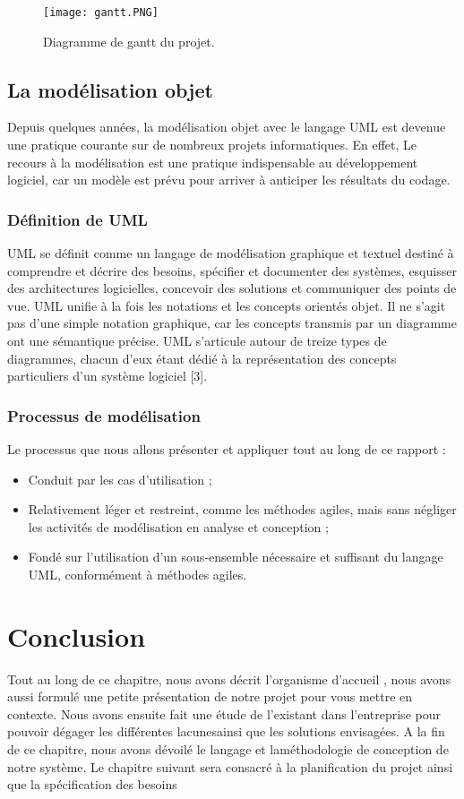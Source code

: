 %
\begin{figure}[ht]
  \centering
  \texttt{[image: gantt.PNG]}
  \caption{Diagramme de gantt du projet.}
  \label{fig:gantt}
\end{figure}
\clearpage
\FloatBarrier
\subsection{La modélisation objet}
Depuis quelques années, la modélisation objet avec le langage UML est devenue une pratique
courante sur de nombreux projets informatiques. En effet, Le recours à la modélisation est
une pratique indispensable au développement logiciel, car un modèle est prévu pour arriver à
anticiper les résultats du codage.
\subsubsection{Définition de UML}
UML se définit comme un langage de modélisation graphique et textuel destiné à comprendre et décrire des besoins, spécifier et documenter des systèmes, esquisser des architectures
logicielles, concevoir des solutions et communiquer des points de vue. UML unifie à la fois les
notations et les concepts orientés objet. Il ne s’agit pas d’une simple notation graphique, car
les concepts transmis par un diagramme ont une sémantique précise.
UML s’articule autour de treize types de diagrammes, chacun d’eux étant dédié à la représentation des concepts particuliers d’un système logiciel [3].


\subsubsection{Processus de modélisation}
Le processus que nous allons présenter et appliquer tout au long de ce rapport :

\begin{itemize}
	\item Conduit par les cas d’utilisation ;
	\item Relativement léger et restreint, comme les méthodes agiles, mais sans négliger les activités
	de modélisation en analyse et conception ;
	\item Fondé sur l’utilisation d’un sous-ensemble nécessaire et suffisant du langage UML, conformément à méthodes agiles.
\end{itemize}



\section{Conclusion}

Tout au long de ce chapitre, nous avons décrit l’organisme d’accueil , nous avons aussi
formulé une petite présentation de notre projet pour vous mettre en contexte. Nous avons
ensuite fait une étude de l’existant dans l’entreprise pour pouvoir dégager les différentes lacunesainsi que les solutions envisagées. A la fin de ce chapitre, nous avons dévoilé le langage et laméthodologie de conception de notre système.
Le chapitre suivant sera consacré à la planification du projet ainsi que la spécification des
besoins
